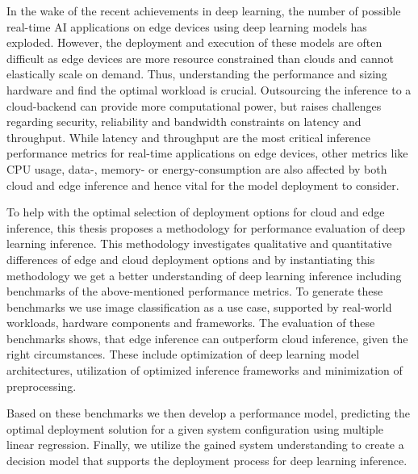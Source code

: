 \noindent In the wake of the recent achievements in deep learning, the number of possible real-time AI applications on edge devices using deep learning models has exploded.
However, the deployment and execution of these models are often difficult as edge devices are more resource constrained than clouds and cannot elastically scale on demand.
Thus, understanding the performance and sizing hardware and find the optimal workload is crucial.
Outsourcing the inference to a cloud-backend can provide more computational power, but raises challenges regarding security, reliability and bandwidth constraints on latency and throughput. 
While latency and throughput are the most critical inference performance metrics for real-time applications on edge devices, other metrics like CPU usage, data-, memory- or energy-consumption are also affected by both cloud and edge inference and hence vital for the model deployment to consider.

To help with the optimal selection of deployment options for cloud and edge inference, this thesis proposes a methodology for performance evaluation of deep learning inference.
This methodology investigates qualitative and quantitative differences of edge and cloud deployment options
and by instantiating this methodology we get a better understanding of deep learning inference including benchmarks of the above-mentioned performance metrics.
To generate these benchmarks we use image classification as a use case, supported by real-world workloads, hardware components and frameworks.
The evaluation of these benchmarks shows, that edge inference can outperform cloud inference, given the right circumstances.
These include optimization of deep learning model architectures, utilization of optimized inference frameworks and minimization of preprocessing.


Based on these benchmarks we then develop a performance model, predicting the optimal deployment solution for a given system configuration using multiple linear regression.
Finally, we utilize the gained system understanding to create a decision model that supports the deployment process for deep learning inference.




